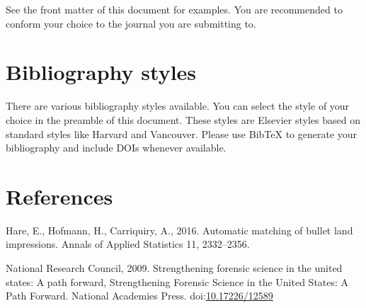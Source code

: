 \documentclass[]{elsarticle} %
\begin{document}
See the front matter of this document for examples. You are recommended
to conform your choice to the journal you are submitting to.

\hypertarget{bibliography-styles}{%
\section{Bibliography styles}\label{bibliography-styles}}

There are various bibliography styles available. You can select the
style of your choice in the preamble of this document. These styles are
Elsevier styles based on standard styles like Harvard and Vancouver.
Please use BibTeX to generate your bibliography and include DOIs
whenever available.

\hypertarget{references}{%
\section*{References}\label{references}}

\hypertarget{refs}{}
\leavevmode\hypertarget{ref-Hare2016}{}%
Hare, E., Hofmann, H., Carriquiry, A., 2016. Automatic matching of
bullet land impressions. Annals of Applied Statistics 11, 2332--2356.

\leavevmode\hypertarget{ref-Council2009}{}%
National Research Council, 2009. Strengthening forensic science in the
united states: A path forward, Strengthening Forensic Science in the
United States: A Path Forward. National Academies Press.
doi:\href{https://doi.org/10.17226/12589}{10.17226/12589}
\end{document}
